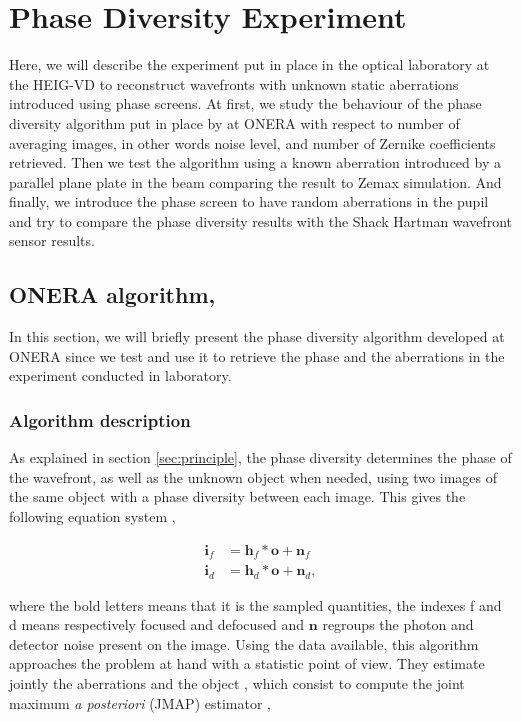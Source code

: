 
\chapter{Phase Diversity Experiment} 
\label{ch:PDExp}

Here, we will describe the experiment put in place in the optical laboratory at the HEIG-VD to reconstruct wavefronts with unknown static aberrations introduced using phase screens. At first, we study the  behaviour of the phase diversity algorithm put in place by \citet{mugnier_2006} at ONERA with respect to number of averaging images, in other words noise level, and number of Zernike coefficients retrieved. Then we test the algorithm using a known aberration introduced by a parallel plane plate in the beam comparing the result to Zemax simulation. And finally, we introduce the phase screen to have random aberrations in the pupil and try to compare the phase diversity results with the Shack Hartman wavefront sensor results.

\section[ONERA algorithm]{ONERA algorithm, \citet{mugnier_2006}}
\label{sec:ONERAalgo}

In this section, we will briefly present the phase diversity algorithm developed at ONERA since we test and use it to retrieve the phase and the aberrations in the experiment conducted in laboratory.

\subsection{Algorithm description}
\label{subsec:OneraAlgoDesc}

As explained in section \ref{sec:principle}, the phase diversity determines the phase of the wavefront, as well as the unknown object when needed, using two images of the same object with a phase diversity between each image. This gives the following equation system \citep[p.11]{mugnier_2006},

\begin{align}
\mathbf{i}_f &= \mathbf{h}_f \ast \mathbf{o} + \mathbf{n}_f \\
\mathbf{i}_d &= \mathbf{h}_d \ast \mathbf{o} + \mathbf{n}_d,
\label{eqt:systemEQT}
\end{align}

where the bold letters means that it is the sampled quantities, the indexes f and d means respectively focused and defocused and $\mathbf{n}$ regroups the photon and detector noise present on the image. Using the data available, this algorithm approaches the problem at hand with a statistic point of view. They estimate jointly the aberrations and the object \citep{Paxman1992}, which consist to compute the joint maximum \textit{a posteriori} (JMAP) estimator \citep[p.17]{mugnier_2006},


